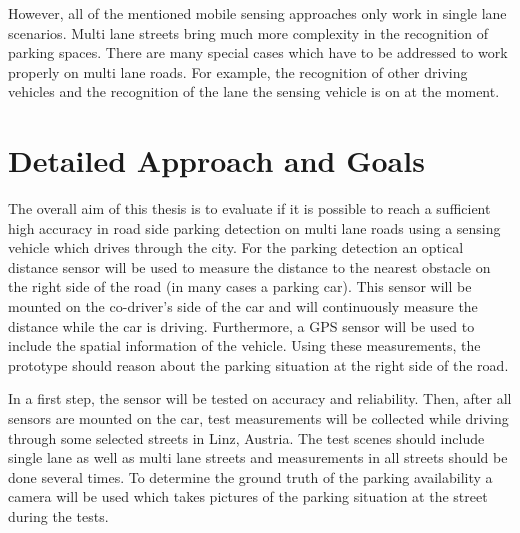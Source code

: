 \documentclass[11pt,a4paper,titlepage,
chapterprefix,headsepline,parskip,pdftex,
,pointlessnumbers,bibtotoc]{article}
\begin{document}
However, all of the mentioned mobile sensing approaches only work in single lane scenarios. Multi lane streets bring much more complexity in the recognition of parking spaces. There are many special cases which have to be addressed to work properly on multi lane roads. For example, the recognition of other driving vehicles and the recognition of the lane the sensing vehicle is on at the moment.




\section{Detailed Approach and Goals}
The overall aim of this thesis is to evaluate if it is possible to reach a sufficient high accuracy in road side parking detection on multi lane roads using a sensing vehicle which drives through the city. 
For the parking detection an optical distance sensor will be used to measure the distance to the nearest obstacle on the right side of the road (in many cases a parking car). This sensor will be mounted on the co-driver's side of the car and will continuously measure the distance while the car is driving. Furthermore, a GPS sensor will be used to include the spatial information of the vehicle. Using these measurements, the prototype should reason about the parking situation at the right side of the road. 

In a first step, the sensor will be tested on accuracy and reliability. Then, after all sensors are mounted on the car, test measurements will be collected while driving through some selected streets in Linz, Austria. The test scenes should include single lane as well as multi lane streets and measurements in all streets should be done several times. To determine the ground truth of the parking availability a camera will be used which takes pictures of the parking situation at the street during the tests.
\end{document}
